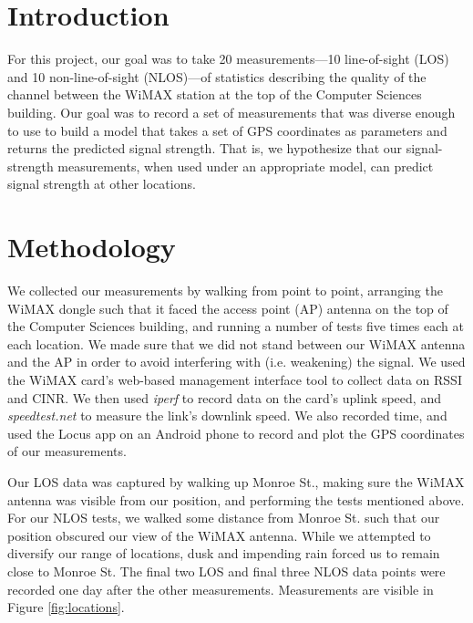 \documentclass[12pt]{article}
\begin{document}
\maketitle


\section{Introduction}
For this project, our goal was to take 20 measurements---10 line-of-sight (LOS)
and 10 non-line-of-sight (NLOS)---of statistics describing the quality of the
channel between the WiMAX station at the top of the Computer Sciences building.
Our goal was to record a set of measurements that was diverse enough to use to
build a model that takes a set of GPS coordinates as parameters and returns the
predicted signal strength. That is, we hypothesize that our signal-strength
measurements, when used under an appropriate model, can predict signal strength
at other locations.

\section{Methodology} We collected our measurements by walking from point to
point, arranging the WiMAX dongle such that it faced the access point (AP)
antenna on the top of the Computer Sciences building, and running a number of
tests five times each at each location. We made sure that we did not stand
between our WiMAX antenna and the AP in order to avoid interfering with (i.e.
weakening) the signal.  We used the WiMAX card's web-based management interface
tool to collect data on RSSI and CINR. We then used \textit{iperf} to record
data on the card's uplink speed, and \textit{speedtest.net} to measure the
link's downlink speed. We also recorded time, and used the Locus app on an
Android phone to record and plot the GPS coordinates of our measurements.

Our LOS data was captured by walking up Monroe St., making sure the WiMAX
antenna was visible from our position, and performing the tests mentioned above.
For our NLOS tests, we walked some distance from Monroe St. such that our
position obscured our view of the WiMAX antenna. While we attempted to diversify
our range of locations, dusk and impending rain forced us to remain close to
Monroe St. The final two LOS and final three NLOS data points were recorded one
day after the other measurements. Measurements are visible in Figure
\ref{fig:locations}.
\end{document}
